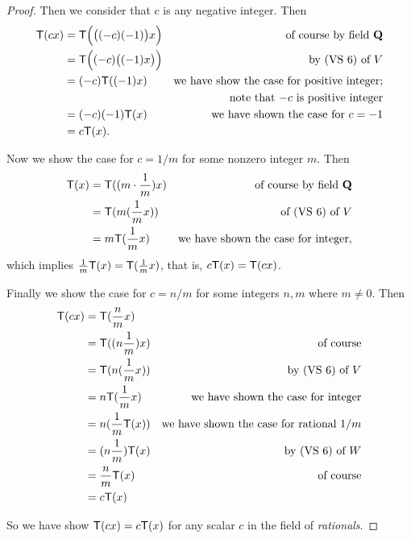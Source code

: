 \begin{proof}
Then we consider that \(c\) is any negative integer.
Then
\begin{align*}
    \textsf{T}(cx) & = \textsf{T}\Big( \big( (-c)(-1) \big) x \Big) & \text{of course by field \(\mathbf{Q}\)} \\
           & = \textsf{T}\Big( (-c) \big( (-1)x \big) \Big) & \text{by (VS 6) of \(V\)} \\
           & = (-c)\textsf{T}((-1)x) & \text{we have show the case for positive integer;} \\
           & & \text{note that \(-c\) is positive integer} \\
           & = (-c)(-1)\textsf{T}(x) & \text{we have shown the case for \(c = -1\)} \\
           & = c\textsf{T}(x).
\end{align*}

Now we show the case for \(c = 1/m\) for some nonzero integer \(m\).
Then
\begin{align*}
    \textsf{T}(x) & = \textsf{T}((m \cdot \frac{1}{m})x) & \text{of course by field \(\mathbf{Q}\)} \\
          & = \textsf{T}(m(\frac{1}{m}x)) & \text{of (VS 6) of \(V\)} \\
          & = m\textsf{T}(\frac{1}{m}x) & \text{we have shown the case for integer},
\end{align*}
which implies \(\frac{1}{m} \textsf{T}(x) = \textsf{T}(\frac{1}{m}x)\), that is, \(c \textsf{T}(x) = \textsf{T}(c x)\).

Finally we show the case for \(c = n/m\) for some integers \(n, m\) where \(m \ne 0\).
Then
\begin{align*}
    \textsf{T}(cx) & = \textsf{T}(\frac{n}{m} x) \\
           & = \textsf{T}((n\frac{1}{m}) x) & \text{of course}\\
           & = \textsf{T}(n(\frac{1}{m}x)) & \text{by (VS 6) of \(V\)} \\
           & = n\textsf{T}(\frac{1}{m}x) & \text{we have shown the case for integer} \\
           & = n (\frac{1}{m}\textsf{T}(x)) & \text{we have shown the case for rational \(1/m\)} \\
           & = (n\frac{1}{m}) \textsf{T}(x) & \text{by (VS 6) of \(W\)} \\
           & = \frac{n}{m} \textsf{T}(x) & \text{of course} \\
           & = c \textsf{T}(x)
\end{align*}

So we have show \(\textsf{T}(cx) = c\textsf{T}(x)\) for any scalar \(c\) in the field of \emph{rationals}.
\end{proof}

